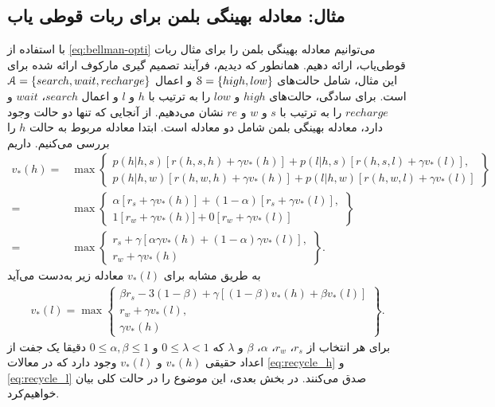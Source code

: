 \subsection{مثال: معادله بهینگی بلمن برای ربات قوطی یاب }
با استفاده از 
\ref{eq:bellman-opti}
می‌توانیم معادله بهینگی بلمن را برای مثال ربات قوطی‌یاب، ارائه دهیم. همانطور که دیدیم، فرآیند تصمیم گیری مارکوف ارائه شده برای این مثال، شامل حالت‌های 
$\EuScript{S} = \{high, low\}$
و اعمال 
$\EuScript{A} = \{search, wait, recharge\}$
است.
برای سادگی، حالت‌های $high$ و $low$ را به ترتیب با $h$ و $l$ و اعمال $search$،
$wait$
و
$recharge$
را به ترتیب با $s$ و $w$ و $re$ نشان می‌دهیم. از آنجایی که تنها دو حالت وجود دارد، معادله بهینگی بلمن شامل دو معادله است. ابتدا معادله مربوط به حالت $h$ را بررسی می‌کنیم. داریم
\begin{align}
v_*(h) =& \max \left\{ 
\begin{array}{lr}
   p(h|h,s) \left[ r(h,s,h)+ \gamma v_*(h) \right] + p(l|h,s) \left[ r(h,s,l)+\gamma v_*(l) \right], \\ 
   p(h|h,w)[r(h,w,h)+ \gamma v_*(h)]+p(l|h,w)[r(h,w,l)+\gamma v_*(l)]
\end{array}
\right\} \nonumber \\
 =& \max \left\{ 
\begin{array}{lr}
   \alpha \left[ r_s+ \gamma v_*(h) \right] + (1 - \alpha) \left[ r_s+\gamma v_*(l) \right], \\ 
   1 \left[ r_w + \gamma v_*(h)]+ 0[r_w + \gamma v_*(l)]
\end{array}
\right\} \\
 =& \max \left\{ 
\begin{array}{lr}
   r_s + \gamma \left[  \alpha \gamma v_*(h) + (1 - \alpha) \gamma v_*(l) \right], \\ 
   r_w + \gamma v_* (h)
\end{array}
\right\}.
\label{eq:recycle_h}
\end{align}
به طریق مشابه برای 
$v_*(l)$
معادله زیر به‌دست می‌آید
\begin{align}
	v_*(l) = \max \left \{ 
	\begin{array}{lr}
		\beta r_s - 3(1-\beta) + \gamma \left[ (1-\beta) v_*(h)+\beta v_*(l)\right] \\
		r_w + \gamma v_*(l), \\
		\gamma v_*(h)
	\end{array}
	\right \}.
	\label{eq:recycle_l}
\end{align}
برای هر انتخاب از 
$r_s$،
$r_w$،
$\alpha$،
$\beta$
و $\lambda$ که 
$0 \le \lambda < 1$
و
$0 \le \alpha,\beta \le 1$
دقیقا یک جفت از اعداد حقیقی 
$v_*(h)$
و 
$v_*(l)$
وجود دارد که در معالات
\ref{eq:recycle_h}
و
\ref{eq:recycle_l}
 صدق می‌کنند\cite{suttonbook}. در بخش بعدی، این موضوع را در حالت کلی بیان خواهیم‌کرد.
